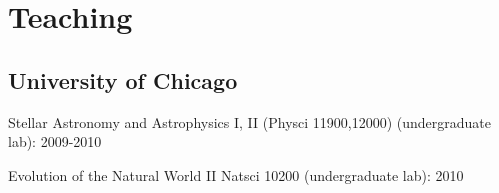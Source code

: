 \documentclass[11pt,letterpaper]{article}
\renewenvironment{itemize}{
  \begin{list}{}{
    \setlength{\leftmargin}{1.5em}
    \setlength{\itemsep}{0.10em}
    \setlength{\parskip}{0pt}
    \setlength{\parsep}{0.10em}
  }
}{
  \end{list}
}
\begin{document}




\section*{\bf Teaching}

\subsection*{University of Chicago} 
\begin{itemize}
\item Stellar Astronomy and Astrophysics I, II (Physci 11900,12000) (undergraduate lab): 2009-2010
\item Evolution of the Natural World II Natsci 10200 (undergraduate lab): 2010
\end{itemize}
\end{document}
